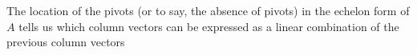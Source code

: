 The location of the pivots (or to say, the absence of pivots) in the echelon form of $A$ tells us which column vectors can be expressed as a linear combination of the previous column vectors 
%

